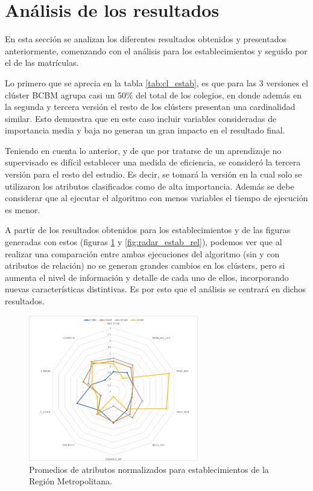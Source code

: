 \section{Análisis de los resultados}

En esta sección se analizan los diferentes resultados obtenidos y presentados anteriormente, comenzando con el análisis para los establecimientos y seguido por el de las matrículas.

Lo primero que se aprecia en la tabla \ref{tab:cl_estab}, es que para las 3 versiones el clúster BCBM agrupa casi un 50\% del total de los colegios, en donde además en la segunda y tercera versión el resto de los clústers presentan una cardinalidad similar. Esto demuestra que en este caso incluir variables consideradas de importancia media y baja no generan un gran impacto en el resultado final.

Teniendo en cuenta lo anterior, y de que por tratarse de un aprendizaje no supervisado es difícil establecer una medida de eficiencia, se consideró la tercera versión para el resto del estudio. Es decir, se tomará la versión en la cual solo se utilizaron los atributos clasificados como de alta importancia. Además se debe considerar que al ejecutar el algoritmo con menos variables el tiempo de ejecución es menor.

A partir de los resultados obtenidos para los establecimientos y de las figuras generadas con estos (figuras \ref{fig:radar_estab} y \ref{fig:radar_estab_rel}), podemos ver que al realizar una comparación entre ambas ejecuciones del algoritmo (sin y con atributos de relación) no se generan grandes cambios en los clústers, pero si aumenta el nivel de información y detalle de cada uno de ellos, incorporando nuevas características distintivas. Es por esto que el análisis se centrará en dichos resultados.

\begin{figure}[hc]
    \centering
    \includegraphics[width=0.66\textwidth]{images/radar_chart_establecimientos_sin.jpg}
    \caption{Promedios de atributos normalizados para establecimientos de la Región Metropolitana.}
    \label{fig:radar_estab}
\end{figure}

